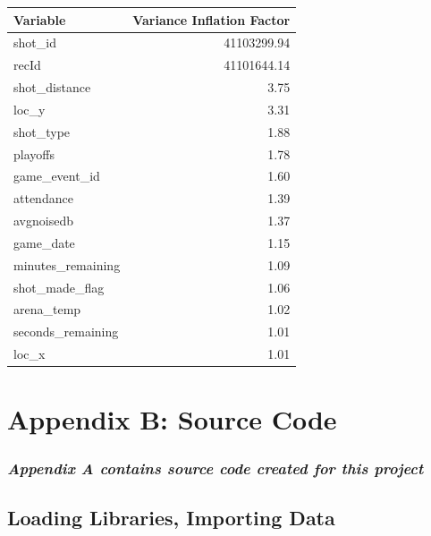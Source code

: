 \documentclass[american,]{article}
\begin{document}
\begin{table}[H]
\centering
\begin{tabular}{lr}
\toprule
Variable & Variance Inflation Factor\\
\midrule
\rowcolor{gray!6}  shot\_id & 41103299.94\\
recId & 41101644.14\\
\rowcolor{gray!6}  shot\_distance & 3.75\\
loc\_y & 3.31\\
\rowcolor{gray!6}  shot\_type & 1.88\\
\addlinespace
playoffs & 1.78\\
\rowcolor{gray!6}  game\_event\_id & 1.60\\
attendance & 1.39\\
\rowcolor{gray!6}  avgnoisedb & 1.37\\
game\_date & 1.15\\
\addlinespace
\rowcolor{gray!6}  minutes\_remaining & 1.09\\
shot\_made\_flag & 1.06\\
\rowcolor{gray!6}  arena\_temp & 1.02\\
seconds\_remaining & 1.01\\
\rowcolor{gray!6}  loc\_x & 1.01\\
\bottomrule
\end{tabular}
\end{table}

\newpage

\hypertarget{appendix-b-source-code}{%
\section{Appendix B: Source Code}\label{appendix-b-source-code}}

\hypertarget{appendix-a-contains-source-code-created-for-this-project}{%
\subsubsection{\texorpdfstring{\emph{Appendix A contains source code created for this project}}{Appendix A contains source code created for this project}}\label{appendix-a-contains-source-code-created-for-this-project}}

\hypertarget{loading-libraries-importing-data}{%
\subsection{Loading Libraries, Importing Data}\label{loading-libraries-importing-data}}
\end{document}
